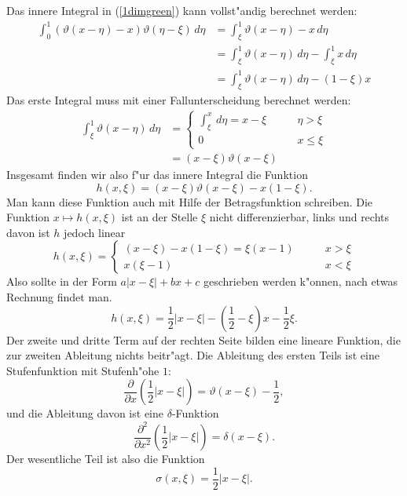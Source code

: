 Das innere Integral in (\ref{1dimgreen}) kann vollst"andig berechnet
werden:
\begin{align*}
\int_0^1(\vartheta(x-\eta)-x)\vartheta(\eta-\xi)\,d\eta
&=
\int_\xi^1\vartheta(x-\eta)-x\,d\eta
\\
&=
\int_\xi^1\vartheta(x-\eta)\,d\eta-\int_\xi^1x\,d\eta
\\
&=
\int_\xi^1\vartheta(x-\eta)\,d\eta-(1-\xi)x
\end{align*}
Das erste Integral muss mit einer Fallunterscheidung berechnet werden:
\begin{align*}
\int_\xi^1\vartheta(x-\eta)\,d\eta
&=
\begin{cases}
\int_\xi^x\,d\eta=x-\xi&\qquad\eta>\xi\\
0&\qquad x\le \xi
\end{cases}
\\
&=(x-\xi)\vartheta(x-\xi)
\end{align*}
Insgesamt finden wir also f"ur das innere
Integral die Funktion
\[
h(x,\xi)=(x-\xi)\vartheta(x-\xi)-x(1-\xi).
\]
Man kann diese Funktion auch mit Hilfe der Betragsfunktion
schreiben.
Die Funktion $x\mapsto h(x,\xi)$ ist an der Stelle $\xi$ nicht 
differenzierbar, links und rechts davon ist $h$ jedoch linear
\[
h(x,\xi)=\begin{cases}
(x-\xi)-x(1-\xi)=\xi(x-1)&\qquad x>\xi\\
x(\xi-1)&\qquad x<\xi
\end{cases}
\]
Also sollte in der Form $a|x-\xi|+bx+c$ geschrieben
werden k"onnen, nach etwas Rechnung findet man.
\[
h(x,\xi)={\textstyle \frac12}|x-\xi|-({\textstyle \frac12}-\xi)x-{\textstyle\frac12}\xi.
\]
Der zweite und dritte Term auf der rechten Seite bilden eine lineare
Funktion, die zur zweiten Ableitung nichts beitr"agt. Die Ableitung
des ersten Teils ist eine Stufenfunktion mit Stufenh"ohe $1$:
\[
\frac{\partial}{\partial x}({\textstyle \frac12}|x-\xi|)
=
\vartheta(x-\xi)
-
{\textstyle\frac12},
\]
und die Ableitung davon ist eine $\delta$-Funktion
\[
\frac{\partial^2}{\partial x^2}({\textstyle \frac12}|x-\xi|)
=
\delta(x-\xi).
\]
Der wesentliche Teil ist also die Funktion
\begin{equation}
\sigma(x,\xi)=\frac12|x-\xi|.\label{n1sigma}
\end{equation}

